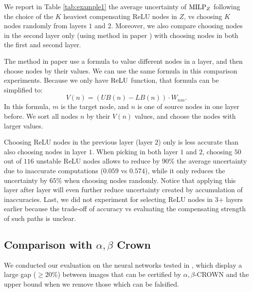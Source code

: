 {\color{red} We report in Table \ref{tab:example1} the average uncertainty of ${\textrm{MILP}}_Z$ following the choice of the $K$ heaviest compensating ReLU nodes in $Z$, vs choosing $K$ nodes randomly from layers $1$ and $2$. 
	Moreover, we also compare choosing nodes in the second layer only (using method in paper \cite{ DivideAndSlide}) with choosing nodes in both the first and second layer.
	
	
		The method in paper \cite{ DivideAndSlide} use a formula to value different nodes in a layer, and then choose nodes by their values. We can use the same formula in this comparison experiments. Because we only have $\mathrm{ReLU}$ function, that formula can be simplified to: $$V(n) = (UB(n)-LB(n))\cdot W_{nm}.$$ In this formula, $m$ is the target node, and $n$ is one of source nodes in one layer before. We sort all nodes $n$ by their $V(n)$ values, and choose the nodes with larger values. 
	
	
	
	Choosing ReLU nodes in the previous layer (layer $2$) only is less accurate than 
	also choosing nodes in layer $1$. 	When picking in both layer $1$ and $2$, choosing $50$ out of $116$ unstable ReLU nodes allows to reduce by $90\%$ the average uncertainty due to inaccurate computations ($0.059$ vs $0.574$), while it only reduces the uncertainty by $65\%$ when choosing nodes randomly. Notice that applying this layer after layer will even further reduce uncertainty created by accumulation of inaccuracies. 
	Last, we did not experiment for selecting ReLU nodes in 3+ layers earlier because the trade-off of accuracy vs evaluating the compensating strength of such paths is unclear. 
	
}
\fi










\subsection{Comparison with $\alpha,\beta$ Crown}



We conducted our evaluation on the neural networks tested in \cite{crown},
which display a large gap ($\geq 20\%$) between images that can be certified by $\alpha,\beta$-CROWN and the upper bound when we remove those which can be falsified.

